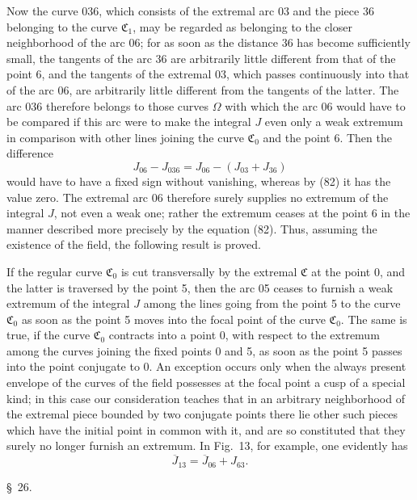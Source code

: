 \documentclass[11pt,a4paper,leqno]{article}
\begin{document}
Now the curve 036, which consists of the extremal arc 03 and the piece 36 belonging to the curve $\mathfrak{C}_1$, may be regarded as belonging to the closer neighborhood of the arc 06; for as soon as the distance 36 has become sufficiently small, the tangents of the arc 36 are arbitrarily little different from that of the point 6, and the tangents of the extremal 03, which passes continuously into that of the arc 06, are arbitrarily little different from the tangents of the latter. The arc 036 therefore belongs to those curves $\Omega$ with which the arc 06 would have to be compared if this arc were to make the integral $J$ even only a weak extremum in comparison with other lines joining the curve $\mathfrak{C}_0$ and the point 6. Then the difference
\[
J_{06}-J_{036}=J_{06}-(J_{03}+J_{36})
\]
would have to have a fixed sign without vanishing, whereas by (82) it has the value zero. The extremal arc 06 therefore surely supplies no extremum of the integral $J$, not even a weak one; rather the extremum ceases at the point 6 in the manner described more precisely by the equation (82). Thus, assuming the existence of the field, the following result is proved.

If the regular curve $\mathfrak{C}_0$ is cut transversally by the extremal $\mathfrak{C}$ at the point 0, and the latter is traversed by the point 5, then the arc 05 ceases to furnish a weak extremum of the integral $J$ among the lines going from the point 5 to the curve $\mathfrak{C}_0$ as soon as the point 5 moves into the focal point of the curve $\mathfrak{C}_0$. The same is true, if the curve $\mathfrak{C}_0$ contracts into a point 0, with respect to the extremum among the curves joining the fixed points 0 and 5, as soon as the point 5 passes into the point conjugate to 0. An exception occurs only when the always present envelope of the curves of the field possesses at the focal point a cusp of a special kind; in this case our consideration teaches that in an arbitrary neighborhood of the extremal piece bounded by two conjugate points there lie other such pieces which have the initial point in common with it, and are so constituted that they surely no longer furnish an extremum. In Fig.~13, for example, one evidently has
\[
\overline{J}_{13}=\overline{J}_{06}+J_{63}.
\]

\begin{center}{\large \S~26.}\end{center}
\end{document}

